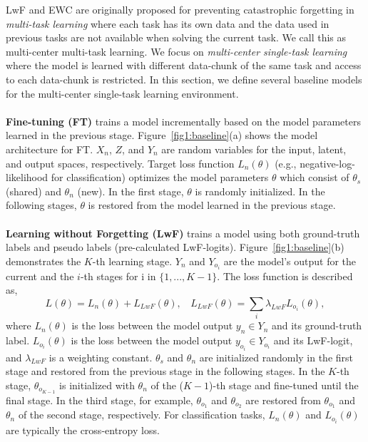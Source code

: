 \documentclass[runningheads,a4paper]{llncs}
\begin{document}
LwF and EWC are originally proposed for preventing catastrophic forgetting in \textit{multi-task learning} where each task has its own data and the data used in previous tasks are not available when solving the current task. We call this as multi-center multi-task learning. We focus on \textit{multi-center single-task learning} where the model is learned with different data-chunk of the same task and access to each data-chunk is restricted. In this section, we define several baseline models for the multi-center single-task learning environment.
\\\\
\noindent\textbf{Fine-tuning (FT)} trains a model incrementally based on the model parameters learned in the previous stage. Figure~\ref{fig1:baseline}(a) shows the model architecture for FT. $X_n$, $Z$, and $Y_n$ are random variables for the input, latent, and output spaces, respectively. Target loss function $L_n(\theta)$ (e.g., negative-log-likelihood for classification) optimizes the model parameters $\theta$ which consist of $\theta_s$ (shared) and $\theta_n$ (new). In the first stage, $\theta$ is randomly initialized. In the following stages, $\theta$ is restored from the model learned in the previous stage.
\\\\
\noindent\textbf{Learning without Forgetting (LwF)} trains a model using both ground-truth labels and pseudo labels (pre-calculated LwF-logits). Figure~\ref{fig1:baseline}(b) demonstrates the $K$-th learning stage. $Y_n$ and $Y_{o_i}$ are the model's output for the current and the $i$-th stages for i in $\{1, ... , K-1\}$. The loss function is described as,
\begin{equation} \label{eq1_lwf}
	L(\theta) = L_n(\theta) + L_{LwF}(\theta), ~~~~ L_{LwF}(\theta) = \sum_i \lambda_{LwF} L_{o_i}(\theta),
\end{equation}
\noindent where $L_n(\theta)$ is the loss between the model output $y_n \in Y_n$ and its ground-truth label. $L_{o_i}(\theta)$ is the loss between the model output $y_{o_i} \in Y_{o_i}$ and its LwF-logit, and $\lambda_{LwF}$ is a weighting constant. $\theta_s$ and $\theta_n$ are initialized randomly in the first stage and restored from the previous stage in the following stages. In the $K$-th stage, $\theta_{o_{K-1}}$ is initialized with $\theta_n$ of the ($K-1$)-th stage and fine-tuned until the final stage. In the third stage, for example, $\theta_{o_1}$ and $\theta_{o_2}$ are restored from $\theta_{o_1}$ and $\theta_n$ of the second stage, respectively. For classification tasks, $L_n(\theta)$ and $L_{o_i}(\theta)$ are typically the cross-entropy loss.
\end{document}
